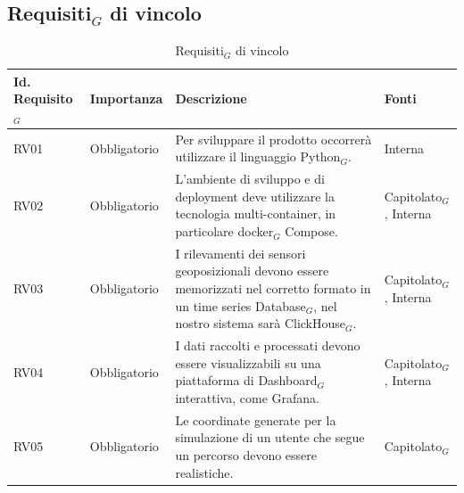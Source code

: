 \documentclass[11pt]{article}
\begin{document}
\begin{justify}
\subsection{Requisiti$_G$ di vincolo}

\begin{table}[H]
\centering
\renewcommand{\arraystretch}{1.5}
\begin{tabular}{|>{\centering\arraybackslash}m{2.7cm}|>{\centering\arraybackslash}m{2.7cm}|>{\centering\arraybackslash}m{6cm}|>{\centering\arraybackslash}m{2.1cm}|}
\hline
\textbf{Id. Requisito$_G$} & \textbf{Importanza} & \textbf{Descrizione} & \textbf{Fonti}\\
\hline
RV01 & Obbligatorio &  Per sviluppare il prodotto occorrerà utilizzare il linguaggio Python$_G$. & Interna\\
\hline 
RV02 & Obbligatorio & L'ambiente di sviluppo e di deployment deve utilizzare la tecnologia multi-container, in particolare docker$_G$ Compose. & Capitolato$_G$, Interna\\
\hline
RV03 & Obbligatorio & I rilevamenti dei sensori geoposizionali
devono essere memorizzati nel corretto formato in un time series Database$_G$, nel nostro sistema sarà ClickHouse$_G$. & Capitolato$_G$, Interna \\
\hline
RV04 & Obbligatorio & I dati raccolti e processati devono essere visualizzabili su una piattaforma di Dashboard$_G$ interattiva, come Grafana. & Capitolato$_G$, Interna\\
\hline
RV05 & Obbligatorio & Le coordinate generate per la simulazione di un utente che segue un percorso devono essere realistiche. & Capitolato$_G$\\
\hline
\end{tabular}

\caption{Requisiti$_G$ di vincolo}
\end{table}


\newpage

\end{justify}
\end{document}
